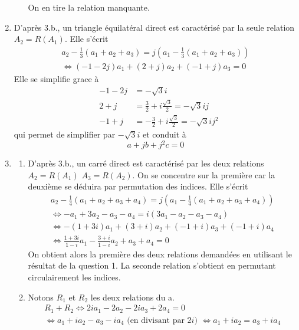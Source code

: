 \begin{enumerate}
\begin{enumerate}
\begin{displaymath}
\end{displaymath}
On en tire la relation manquante.
\end{enumerate}
\item D'après 3.b., un triangle équilatéral direct est caractérisé par la seule relation $A_2=R(A_1)$. Elle s'écrit
\begin{multline*}
 a_2-\frac{1}{3}\left(a_1+a_2+a_3 \right) = j\left(a_1- \frac{1}{3}\left(a_1+a_2+a_3 \right)\right)  \\
\Leftrightarrow
(-1-2j)a_1 + (2+j)a_2 + (-1+j)a_3 = 0
\end{multline*}
Elle se simplifie grace à
\begin{align*}
 &-1-2j &= -\sqrt{3}i\\
 &2+j &= \frac{3}{2}+i\frac{\sqrt{3}}{2}= -\sqrt{3}ij\\
 &-1+j &= -\frac{3}{2}+i\frac{\sqrt{3}}{2}= -\sqrt{3}ij^2
\end{align*}
qui permet de simplifier par $-\sqrt{3}i$ et conduit à 
\begin{displaymath}
 a + jb + j^2c =0
\end{displaymath}
\item 
\begin{enumerate}
\item D'après 3.b., un carré direct est caractérisé par les deux relations $A_2=R(A_1)$ $A_3=R(A_2)$. On se concentre sur la première car la deuxième se déduira par permutation des indices. Elle s'écrit
\begin{multline*}
a_2-\frac{1}{4}\left(a_1+a_2+a_3 +a_4\right) = j\left(a_1- \frac{1}{4}\left(a_1+a_2+a_3 +a_4\right)\right)  \\ 
\Leftrightarrow
-a_1+3a_2-a_3-a_4 = i(3a_1-a_2-a_3-a_4) \\
\Leftrightarrow
-(1+3i)a_1+(3+i)a_2+(-1+i)a_3+(-1+i)a_4\\
\Leftrightarrow
\frac{1+3i}{1-i}a_1 - \frac{3+i}{1-i}a_2 + a_3 + a_4 = 0
\end{multline*}
On obtient alors la première des deux relations demandées en utilisant le résultat de la question 1. La seconde relation s'obtient en permutant circulairement les indices.
\item Notons $R_1$ et $R_2$ les deux relations du a.
\begin{multline*}
 R_1 + R_2 
\Leftrightarrow 2ia_1 - 2a_2 -2ia_3 +2a_4 =0 \\
\Leftrightarrow a_1 + ia_2 -a_3-ia_4 \text{ (en divisant par $2i$) }
\Leftrightarrow a_1+ia_2 = a_3 + ia_4
\end{multline*}

\end{enumerate}
\end{enumerate}
